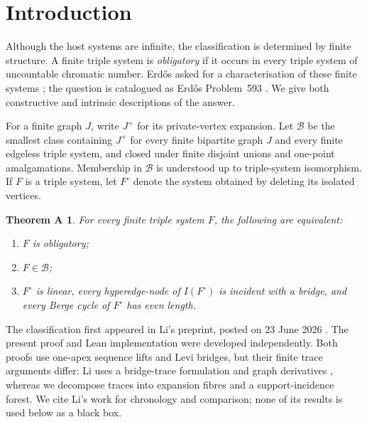 \documentclass[a4paper,11pt,reqno]{amsart}
\theoremstyle{plain}
\newtheorem*{theoremA}{Theorem A}
\theoremstyle{definition}
\theoremstyle{remark}
\begin{document}
\maketitle

\section*{Introduction}\label{introduction}

Although the host systems are infinite, the classification is determined by
finite structure.  A finite triple system is \emph{obligatory} if it occurs
in every triple system of uncountable chromatic number.  Erdős asked for a
characterisation of these finite systems \citep{erdos1995}; the question is
catalogued as Erdős Problem~593 \citep{bloom593}.  We give both constructive
and intrinsic descriptions of the answer.

For a finite graph $J$, write $J^+$ for its private-vertex expansion.  Let
$\mathcal B$ be the smallest class containing $J^+$ for every finite
bipartite graph $J$ and every finite edgeless triple system, and closed under
finite disjoint unions and one-point amalgamations.  Membership in
$\mathcal B$ is understood up to triple-system isomorphism.  If $F$ is a
triple system, let $F^\circ$ denote the system obtained by deleting its
isolated vertices.

\begin{theoremA}\label{theorem-a-exact-characterisation}
For every finite triple system $F$, the following are equivalent:
\begin{enumerate}
\item $F$ is obligatory;
\item $F\in\mathcal B$;
\item $F^\circ$ is linear, every hyperedge-node of $I(F^\circ)$ is incident
with a bridge, and every Berge cycle of $F^\circ$ has even length.
\end{enumerate}
\end{theoremA}

The classification first appeared in Li's preprint, posted on 23 June 2026
\citep[Theorem~1.1]{li2026}.  The present proof and Lean implementation were
developed independently.  Both proofs use one-apex sequence lifts and Levi
bridges, but their finite trace arguments differ: Li uses a bridge-trace
formulation and graph derivatives \citep[Sections~3--4 and Theorem~4.6]{li2026},
whereas we decompose traces into expansion fibres and a support-incidence
forest.  We cite Li's work for chronology and comparison; none of its results
is used below as a black box.
\end{document}
